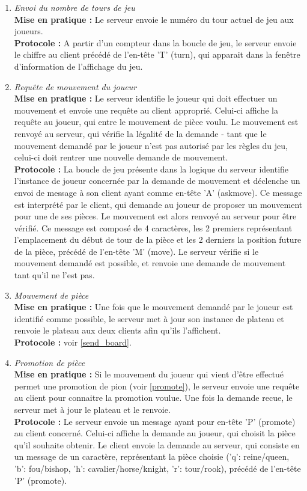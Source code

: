 \documentclass[10pt, a4paper]{article}
\begin{document}
\begin{enumerate}
\item \textit{Envoi du nombre de tours de jeu} \\
\textbf{Mise en pratique :} Le serveur envoie le numéro du tour actuel de jeu aux joueurs.  \\
\textbf{Protocole :} A partir d'un compteur dans la boucle de jeu, le serveur envoie le chiffre au client précédé de l'en-tête 'T' (turn), qui apparait dans la fenêtre d'information de l'affichage du jeu.
\label{send_turn}

\item \textit{Requête de mouvement du joueur} \\
\textbf{Mise en pratique :} Le serveur identifie le joueur qui doit effectuer un mouvement et envoie une requête au client approprié. Celui-ci affiche la requête au joueur, qui entre le mouvement de pièce voulu. Le mouvement est renvoyé au serveur, qui vérifie la légalité de la demande - tant que le mouvement demandé par le joueur n'est pas autorisé par les règles du jeu, celui-ci doit rentrer une nouvelle demande de mouvement.\\
\textbf{Protocole :} La boucle de jeu présente dans la logique du serveur identifie l'instance de joueur concernée par la demande de mouvement et déclenche un envoi de message à son client ayant comme en-tête 'A' (askmove). Ce message est interprété par le client, qui demande au joueur de proposer un mouvement pour une de ses pièces. Le mouvement est alors renvoyé au serveur pour être vérifié. Ce message est composé de 4 caractères, les 2 premiers représentant l'emplacement du début de tour de la pièce et les 2 derniers la position future de la pièce, précédé de l'en-tête 'M' (move). Le serveur vérifie si le mouvement demandé est possible, et renvoie une demande de mouvement tant qu'il ne l'est pas.

\item \textit{Mouvement de pièce} \\
\textbf{Mise en pratique :} Une fois que le mouvement demandé par le joueur est identifié comme possible, le serveur met à jour son instance de plateau et renvoie le plateau aux deux clients afin qu'ils l'affichent.  \\
\textbf{Protocole :} voir \ref{send_board}.

\item \textit{Promotion de pièce}\\
\textbf{Mise en pratique :} Si le mouvement du joueur qui vient d'être effectué permet une promotion de pion (voir \ref{promote}), le serveur envoie une requête au client pour connaitre la promotion voulue. Une fois la demande recue, le serveur met à jour le plateau et le renvoie.\\
\textbf{Protocole :} Le serveur envoie un message ayant pour en-tête 'P' (promote) au client concerné. Celui-ci affiche la demande au joueur, qui choisit la pièce qu'il souhaite obtenir. Le client envoie la demande au serveur, qui consiste en un message de un caractère, représentant la pièce choisie ('q':  reine/queen, 'b': fou/bishop, 'h': cavalier/horse/knight, 'r': tour/rook), précédé de l'en-tête 'P' (promote).


\end{enumerate}
\end{document}
